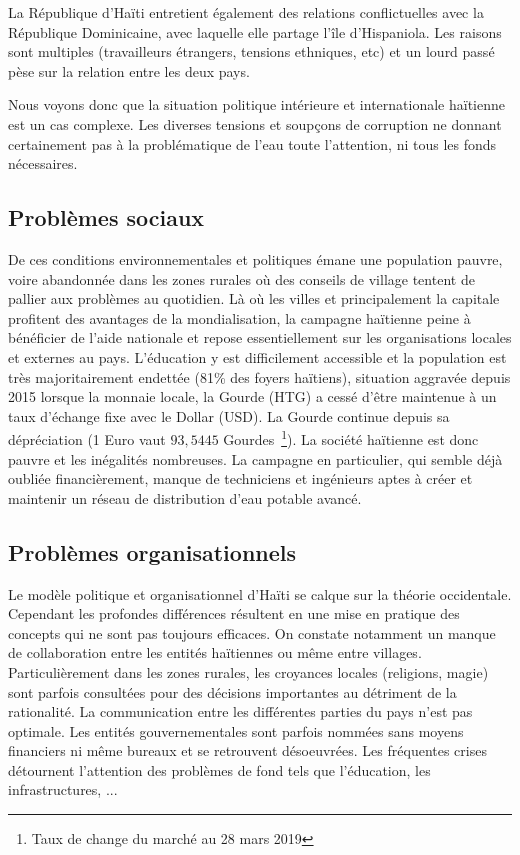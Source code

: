 \documentclass{EPL-master-thesis-covers-FR}
\begin{document}
				La République d'Haïti entretient également des relations conflictuelles avec la République Dominicaine, avec laquelle elle partage l'île d'Hispaniola. Les raisons sont multiples (travailleurs étrangers, tensions ethniques, etc) et un lourd passé pèse sur la relation entre les deux pays.

				Nous voyons donc que la situation politique intérieure et internationale haïtienne est un cas complexe. Les diverses tensions et soupçons de corruption ne donnant certainement pas à la problématique de l'eau toute l'attention, ni tous les fonds nécessaires.

			\subsection*{Problèmes sociaux}

				De ces conditions environnementales et politiques émane une population pauvre, voire abandonnée dans les zones rurales où des conseils de village tentent de pallier aux problèmes au quotidien. Là où les villes et principalement la capitale profitent des avantages de la mondialisation, la campagne haïtienne peine à bénéficier de l'aide nationale et repose essentiellement sur les organisations locales et externes au pays. L'éducation y est difficilement accessible et la population est très majoritairement endettée (81\% des foyers haïtiens), situation aggravée depuis 2015 lorsque la monnaie locale, la Gourde (HTG) a cessé d'être maintenue à un taux d'échange fixe avec le Dollar (USD). La Gourde continue depuis sa dépréciation (1 Euro vaut $93,5445$ Gourdes~\footnote{Taux de change du marché au 28 mars 2019}). La société haïtienne est donc pauvre et les inégalités nombreuses. La campagne en particulier, qui semble déjà oubliée financièrement, manque de techniciens et ingénieurs aptes à créer et maintenir un réseau de distribution d'eau potable avancé.

			\subsection*{Problèmes organisationnels}
				Le modèle politique et organisationnel d'Haïti se calque sur la théorie occidentale. Cependant les profondes différences résultent en une mise en pratique des concepts qui ne sont pas toujours efficaces.
				On constate notamment un manque de collaboration entre les entités haïtiennes ou même entre villages. Particulièrement dans les zones rurales, les croyances locales (religions, magie) sont parfois consultées pour des décisions importantes au détriment de la rationalité. La communication entre les différentes parties du pays n'est pas optimale. Les entités gouvernementales sont parfois nommées sans moyens financiers ni même bureaux et se retrouvent désoeuvrées. Les fréquentes crises détournent l'attention des problèmes de fond tels que l'éducation, les infrastructures, ...
\end{document}
